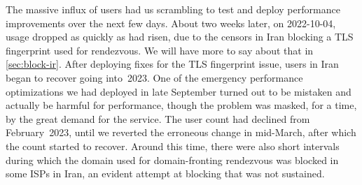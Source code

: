 \documentclass[letterpaper,twocolumn]{article}
\begin{document}
The massive influx of users had us scrambling to test and deploy
performance improvements over the next few days.
About two weeks later, on \mbox{2022-10-04},
usage dropped as quickly as had risen,
due to the censors in Iran blocking a TLS fingerprint
used for rendezvous.
We will have more to say about that in \autoref{sec:block-ir}.
After deploying fixes for the TLS fingerprint issue,
users in Iran began to recover going into~2023.
One of the emergency performance optimizations we had deployed in late September
turned out to be mistaken and actually be harmful for performance,
though the problem was masked, for a time, by the great demand for the service.
The user count had declined from February~2023,
until we reverted the erroneous change in mid-March,
after which the count started to recover.
Around this time, there were also short intervals during which
the domain used for domain-fronting rendezvous
was blocked in some ISPs in Iran,
an evident attempt at blocking that was not sustained.
\end{document}
